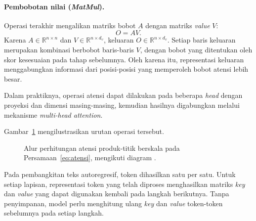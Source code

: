 \paragraph{Pembobotan nilai (\textit{MatMul}).}
Operasi terakhir mengalikan matriks bobot $A$ dengan matriks
\textit{value} $V$:
\begin{equation}
O=AV.
\label{eq:atensi-output}
\end{equation}
Karena $A\in\mathbb{R}^{n\times n}$ dan
$V\in\mathbb{R}^{n\times d_v}$, keluaran
$O\in\mathbb{R}^{n\times d_v}$. Setiap baris keluaran merupakan
kombinasi berbobot baris-baris $V$, dengan bobot yang ditentukan
oleh skor kesesuaian pada tahap sebelumnya. Oleh karena itu,
representasi keluaran menggabungkan informasi dari posisi-posisi
yang memperoleh bobot atensi lebih besar.

Dalam praktiknya, operasi atensi dapat dilakukan pada beberapa
\textit{head} dengan proyeksi dan dimensi masing-masing, kemudian
hasilnya digabungkan melalui mekanisme
\textit{multi-head attention}.

Gambar~\ref{fig:atensi} mengilustrasikan urutan operasi tersebut.

\begin{figure}[H]
\centering
{}
\caption{Alur perhitungan atensi produk-titik berskala pada
Persamaan~\eqref{eq:atensi}, mengikuti diagram \citet{vaswani}.}
\label{fig:atensi}
\end{figure}

Pada pembangkitan teks autoregresif, token dihasilkan satu per
satu. Untuk setiap lapisan, representasi token yang telah diproses
menghasilkan matriks \textit{key} dan \textit{value} yang dapat digunakan kembali
pada langkah berikutnya. Tanpa penyimpanan, model perlu menghitung
ulang \textit{key} dan \textit{value} token-token sebelumnya pada setiap langkah.

